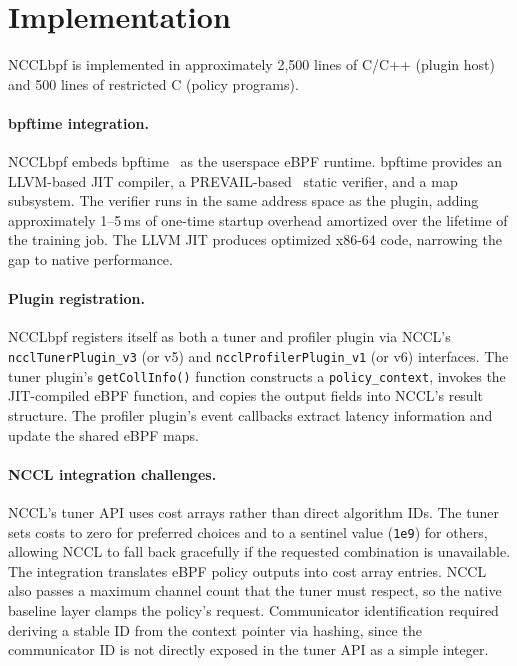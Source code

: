 \documentclass[sigplan,10pt]{acmart}
\newcommand{\sysname}{NCCLbpf\xspace}
\begin{document}
\section{Implementation}
\label{sec:impl}

\sysname is implemented in approximately 2{,}500 lines of C/C++
(plugin host) and 500 lines of restricted C (policy programs).

\paragraph{bpftime integration.}
\sysname embeds bpftime~\cite{bpftime} as the userspace eBPF runtime.
bpftime provides an LLVM-based JIT compiler, a
PREVAIL-based~\cite{prevail} static verifier, and a map subsystem.
The verifier runs in the same address space as the plugin, adding
approximately 1--5\,ms of one-time startup overhead amortized over
the lifetime of the training job. The LLVM JIT produces optimized x86-64 code, narrowing the gap
to native performance.

\paragraph{Plugin registration.}
\sysname registers itself as both a tuner and profiler plugin via
NCCL's \texttt{ncclTunerPlugin\_v3} (or v5) and
\texttt{ncclProfilerPlugin\_v1} (or v6) interfaces. The tuner
plugin's \texttt{getCollInfo()} function constructs a
\texttt{policy\_context}, invokes the JIT-compiled eBPF function,
and copies the output fields into NCCL's result structure. The
profiler plugin's event callbacks extract latency information and
update the shared eBPF maps.

\paragraph{NCCL integration challenges.}
NCCL's tuner API uses cost arrays rather than direct algorithm IDs.
The tuner sets costs to zero for preferred choices and to a sentinel
value (\texttt{1e9}) for others, allowing NCCL to fall back
gracefully if the requested combination is unavailable. The
integration translates eBPF policy outputs into cost array entries.
NCCL also passes a maximum channel count that the tuner must respect,
so the native baseline layer clamps the policy's request. Communicator
identification required deriving a stable ID from the context pointer
via hashing, since the communicator ID is not directly exposed in the
tuner API as a simple integer.
\end{document}
